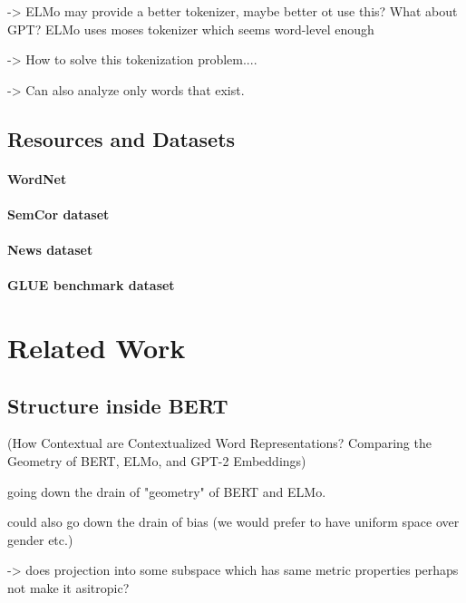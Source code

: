 \documentclass[a4paper,12pt,twoside,openright]{report}
\begin{document}
-> ELMo may provide a better tokenizer, maybe better ot use this? What about GPT? ELMo uses moses tokenizer which seems word-level enough

-> How to solve this tokenization problem....

-> Can also analyze only words that exist.


\section{Resources and Datasets}

\subsubsection{WordNet}

\subsubsection{SemCor dataset}

\subsubsection{News dataset}

\subsubsection{GLUE benchmark dataset}







\chapter{Related Work}

\section{Structure inside BERT}

(How Contextual are Contextualized Word Representations? Comparing the Geometry of BERT, ELMo, and GPT-2 Embeddings)

going down the drain of "geometry" of BERT and ELMo.

could also go down the drain of bias (we would prefer to have uniform space over gender etc.)

-> does projection into some subspace which has same metric properties perhaps not make it asitropic?
\end{document}
